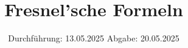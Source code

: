 

\subject{v407}
\title{Fresnel'sche Formeln}
\date{%
  Durchführung: 13.05.2025
  \hspace{3em}
  Abgabe: 20.05.2025
}



\maketitle
\thispagestyle{empty}
\tableofcontents
\newpage






\printbibliography{}


